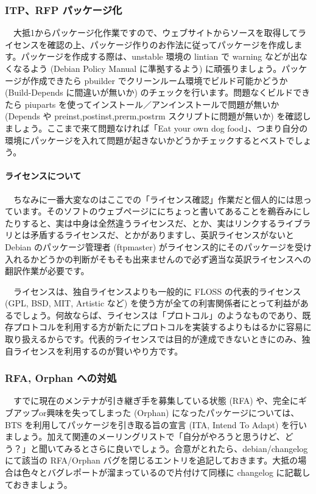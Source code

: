 \documentclass[mingoth,a4paper]{jsarticle}
\begin{document}
\subsubsection{ITP、RFP パッケージ化}

　大抵1からパッケージ化作業ですので、ウェブサイトからソースを取得してライセンスを確認の上、パッケージ作りのお作法に従ってパッケージを作成します。パッケージを作成する際は、unstable 環境の lintian で warning などが出なくなるよう (Debian Policy Manual に準拠するよう) に頑張りましょう。パッケージが作成できたら pbuilder でクリーンルーム環境でビルド可能かどうか (Build-Depends に間違いが無いか) のチェックを行います。問題なくビルドできたら piuparts を使ってインストール／アンインストールで問題が無いか (Depends や preinst,postinst,prerm,postrm スクリプトに問題が無いか) を確認しましょう。ここまで来て問題なければ「Eat your own dog food」、つまり自分の環境にパッケージを入れて問題が起きないかどうかチェックするとベストでしょう。

\begin{screen}
\paragraph*{ライセンスについて}
　ちなみに一番大変なのはここでの「ライセンス確認」作業だと個人的には思っています。そのソフトのウェブページににちょっと書いてあることを鵜呑みにしたりすると、実は中身は全然違うライセンスだ、とか、実はリンクするライブラリとは矛盾するライセンスだ、とかがありますし、英訳ライセンスがないと Debian のパッケージ管理者 (ftpmaster) がライセンス的にそのパッケージを受け入れるかどうかの判断がそもそも出来ませんので必ず適当な英訳ライセンスへの翻訳作業が必要です。

　ライセンスは、独自ライセンスよりも一般的に FLOSS の代表的ライセンス (GPL, BSD, MIT, Artistic など) を使う方が全ての利害関係者にとって利益があるでしょう。何故ならば、ライセンスは「プロトコル」のようなものであり、既存プロトコルを利用する方が新たにプロトコルを実装するよりもはるかに容易に取り扱えるからです。代表的ライセンスでは目的が達成できないときにのみ、独自ライセンスを利用するのが賢いやり方です。
\end{screen}

\subsubsection{RFA, Orphan への対処}

　すでに現在のメンテナが引き継ぎ手を募集している状態 (RFA) や、完全にギブアップor興味を失ってしまった (Orphan) になったパッケージについては、BTS を利用してパッケージを引き取る旨の宣言 (ITA, Intend To Adapt) を行いましょう。加えて関連のメーリングリストで「自分がやろうと思うけど、どう？」と聞いてみるとさらに良いでしょう。合意がとれたら、debian/changelog にて該当の RFA/Orphan バグを閉じるエントリを追記しておきます。大抵の場合は色々とバグレポートが溜まっているので片付けて同様に changelog に記載しておきましょう。
\end{document}
